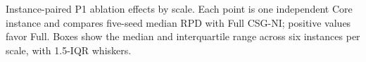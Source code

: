 \caption{Instance-paired P1 ablation effects by scale. Each point is one independent Core instance and compares five-seed median RPD with Full CSG-NI; positive values favor Full. Boxes show the median and interquartile range across six instances per scale, with 1.5-IQR whiskers.}
